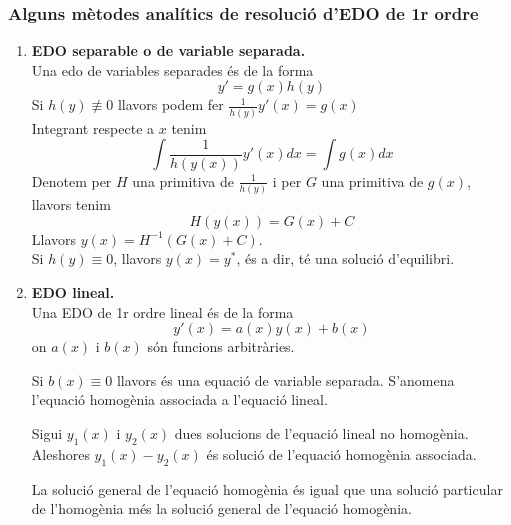 \documentclass[../main.tex]{subfiles}
\begin{document}
\subsubsection{Alguns mètodes analítics de resolució d'EDO de 1r ordre}
\begin{enumerate}
    \item \textbf{EDO separable o de variable separada.}\\
    Una edo de variables separades és de la forma
    \begin{displaymath}
        y' = g\left(x\right) h\left(y\right)
    \end{displaymath}
    Si $h\left(y\right) \not\equiv 0$ llavors podem fer $\frac{1}{h\left(y\right)} y'\left(x\right) = g\left(x\right)$\\
    Integrant respecte a $x$ tenim
    \begin{displaymath}
        \int \frac{1}{h\left(y(x)\right)} y'(x) dx = \int g(x) dx
    \end{displaymath}
    Denotem per $H$ una primitiva de $\frac{1}{h\left(y\right)}$ i per $G$ una primitiva de $g(x)$,
    llavors tenim
    \begin{displaymath}
        H(y(x)) = G(x) + C
    \end{displaymath}
    Llavors $y(x) = H^{-1}\left(G(x)+C\right)$.\\
    Si $h\left(y\right) \equiv 0$, llavors $y(x) = y^*$, és a dir, té una solució d'equilibri.
    \item \textbf{EDO lineal.}\\
    Una EDO de 1r ordre lineal és de la forma
    \begin{displaymath}
        y'(x) = a(x) y(x) + b(x)
    \end{displaymath}
    on $a(x)$ i $b(x)$ són funcions arbitràries.
    \begin{obs}
        Si $b(x) \equiv 0$ llavors és una equació de variable separada. S'anomena l'equació
        homogènia associada a l'equació lineal.
    \end{obs}
    \begin{proposicio}
        Sigui $y_1(x)$ i $y_2(x)$ dues solucions de l'equació lineal no homogènia. Aleshores $y_1(x)-y_2(x)$
        és solució de l'equació homogènia associada.
    \end{proposicio}
    \begin{corolari}
        La solució general de l'equació homogènia és igual que una solució particular de l'homogènia
        més la solució general de l'equació homogènia.

\end{corolari}
\end{enumerate}
\end{document}
